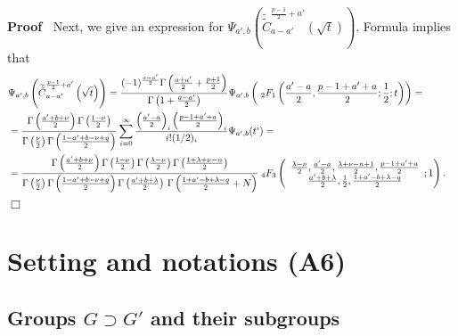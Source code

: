 \documentclass{article}
\renewenvironment{proof}{\noindent\textbf{Proof\ }}{\hspace*{\fill}$\Box$\medskip}
\theoremstyle{remark}
\begin{document}
\begin{proof}
  Next, we give an expression for $\Psi_{a', b} \left(
  \widetilde{\tilde{C}}^{\frac{p - 1}{2} + a'}_{a - a'} \left( \sqrt{t}
  \right) \right)$. Formula {\cite[(21)]{gegenbauer}} implies that
  \begin{eqnarray}
    & \Psi_{a', b} \left( \widetilde{\tilde{C}}^{\frac{p - 1}{2} + a'}_{a -
    a'} \left( \sqrt{t} \right) \right) = \frac{(- 1)^{\frac{a - a'}{2}}
    \Gamma \left( \frac{a + a'}{2} + \frac{p + 1}{2} \right)}{\Gamma \left( 1
    + \frac{a - a'}{2} \right)} \Psi_{a', b} \left( \;_2 F_1 \left( \frac{a' -
    a}{2}, \frac{p - 1 + a' + a}{2} ; \frac{1}{2} ; t \right) \right) = & 
    \nonumber\\
    & = \frac{\Gamma \left( \frac{a' + b + \nu}{2} \right) \Gamma \left(
    \frac{1 - \nu}{2} \right)}{\Gamma \left( \frac{\nu}{2} \right) \Gamma
    \left( \frac{1 - a' + b - \nu + q}{2} \right)} \sum_{i = 0}^{\infty}
    \frac{\left( \frac{a' - a}{2} \right)_i \left( \frac{p - 1 + a' + a}{2}
    \right)_i}{i! (1 / 2)_i} \Psi_{a', b} (t^i) = &  \nonumber\\
    & = \frac{\Gamma \left( \frac{a' + b + \nu}{2} \right) \Gamma \left(
    \frac{1 - \nu}{2} \right) \Gamma \left( \frac{\lambda - \nu}{2} \right)
    \Gamma \left( \frac{1 + \lambda + \nu - n}{2} \right)}{\Gamma \left(
    \frac{\nu}{2} \right) \Gamma \left( \frac{1 - a' + b - \nu + q}{2} \right)
    \Gamma \left( \frac{a' + b + \lambda}{2} \right)  \hspace{0.17em} \Gamma
    \left( \frac{1 + a' - b + \lambda - q}{2} + N \right)} \;_4 F_3 \left(
    \begin{array}{c}
      \frac{\lambda - \nu}{2}, \frac{a' - a}{2}, \frac{\lambda + \nu - n +
      1}{2}, \frac{p - 1 + a' + a}{2}\\
      \frac{a' + b + \lambda}{2}, \frac{1}{2}, \frac{1 + a' - b + \lambda -
      q}{2}
    \end{array} ; 1 \right) . &  \nonumber
  \end{eqnarray}
\end{proof}

\section{Setting and notations (A6)}\label{sec:def-n-nots}

\subsection{Groups $G \supset G'$ and their subgroups}
\end{document}

